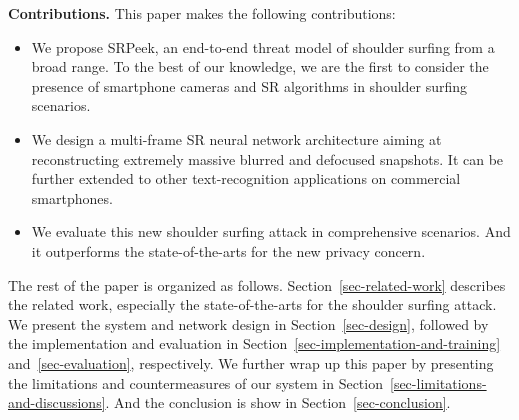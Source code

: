 \vspace{1mm}
\noindent
\textbf{Contributions.} This paper makes the following contributions:
\begin{itemize}[leftmargin=*]
  \item	We propose \textsf{SRPeek}, an end-to-end threat model of shoulder surfing from a broad range. To the best of our knowledge, we are the first to consider the presence of smartphone cameras and SR algorithms in shoulder surfing scenarios.
  \item	We design a multi-frame SR neural network architecture aiming at reconstructing extremely massive blurred and defocused snapshots. It can be further extended to other text-recognition applications on commercial smartphones.
  \item	We evaluate this new shoulder surfing attack in comprehensive scenarios. And it outperforms the state-of-the-arts for the new privacy concern.
\end{itemize}
The rest of the paper is organized as follows. Section~\ref{sec-related-work} describes the related work, especially the state-of-the-arts for the shoulder surfing attack. We present the system and network design in Section~\ref{sec-design}, followed by the implementation and evaluation in Section~\ref{sec-implementation-and-training} and~\ref{sec-evaluation}, respectively. We further wrap up this paper by presenting the limitations and countermeasures of our system in Section~\ref{sec-limitations-and-discussions}. And the conclusion is show in Section~\ref{sec-conclusion}.
